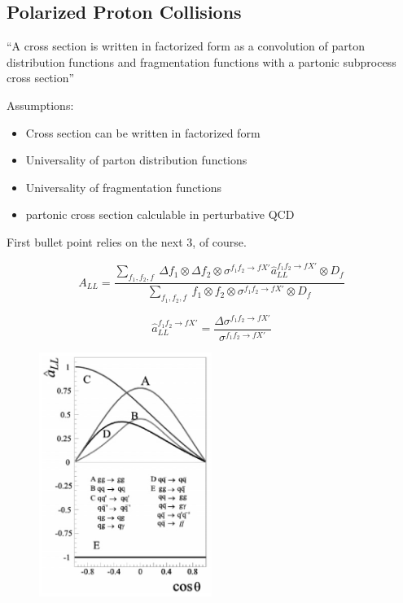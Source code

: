 \subsection{Polarized Proton Collisions}

``A cross section is written in factorized form as a convolution of parton distribution functions and fragmentation functions with a partonic subprocess cross section''

Assumptions:
\begin{itemize}
  \item Cross section can be written in factorized form
  \item Universality of parton distribution functions
  \item Universality of fragmentation functions
  \item partonic cross section calculable in perturbative QCD
\end{itemize}

First bullet point relies on the next 3, of course.

\begin{equation}
  A_{LL} = \frac{\sum_{f_1,f_2,f}~\Delta f_1 \otimes \Delta f_2 \otimes \sigma^{f_1 f_2 \rightarrow f X'} \hat a_{LL}^{f_1 f_2 \rightarrow f X'} \otimes D_f}{\sum_{f_1,f_2,f}~f_1 \otimes f_2 \otimes \sigma^{f_1 f_2 \rightarrow f X'} \otimes D_f} 
\end{equation}

\begin{equation}
  \hat a_{LL}^{f_1 f_2 \rightarrow f X'} = \frac{\Delta \sigma^{f_1 f_2 \rightarrow f X'}}{\sigma^{f_1 f_2 \rightarrow f X'}}
\end{equation}

\begin{figure}\begin{center}
  \includegraphics[width=0.5\textwidth]{figures/partonic_asymmetry}
  \caption{\cite{Bunce:2000uv}}
\end{center}\end{figure}
